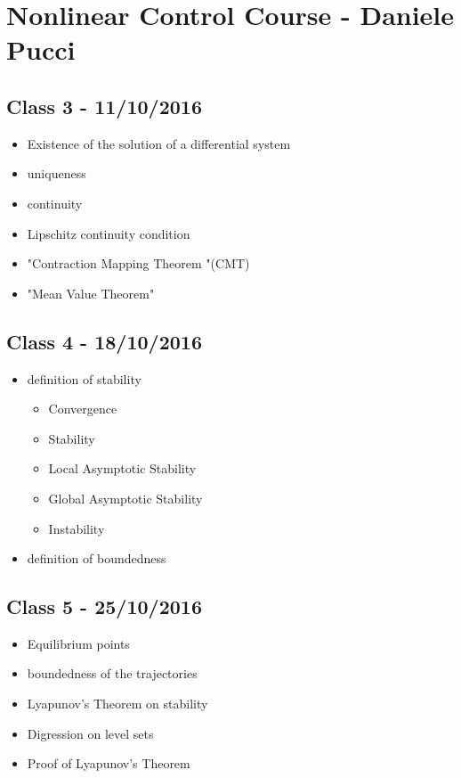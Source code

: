 \section{Nonlinear Control Course - Daniele Pucci}

\subsection*{Class 3 - 11/10/2016}
\begin{itemize}
\item Existence of the solution of a differential system
\item uniqueness
\item continuity
\item Lipschitz continuity condition
\item "Contraction Mapping Theorem "(CMT)
\item "Mean Value Theorem"
\end{itemize}

\subsection*{Class 4 - 18/10/2016}

\begin{itemize}
\item definition of stability

\begin{itemize}
\item Convergence
\item Stability
\item Local Asymptotic Stability
\item Global Asymptotic Stability
\item Instability
\end{itemize}
\item definition of boundedness
\end{itemize}
\subsection*{Class 5 - 25/10/2016}

\begin{itemize}
\item Equilibrium points
\item boundedness of the trajectories
\item Lyapunov's Theorem on stability
\item Digression on level sets 
\item Proof of Lyapunov's Theorem
\end{itemize}

